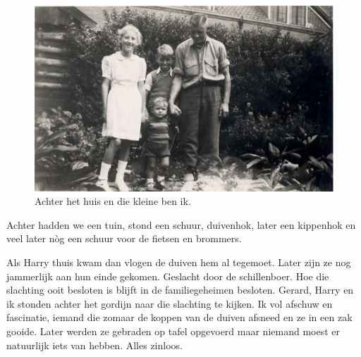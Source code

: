 \documentclass[12pt,twoside, openright]{memoir}
\begin{document}
\begin{figure}
\centering
\includegraphics[width=\textwidth]{img/34Rosmstraat2}
\caption*{\footnotesize Achter het huis en die kleine ben ik.}
\end{figure}

Achter hadden we een tuin, stond een schuur, duivenhok, later een kippenhok en veel later nòg een schuur voor de fietsen en brommers. 

Als Harry thuis kwam dan vlogen de duiven hem al tegemoet. Later zijn ze nog jammerlijk aan hun einde gekomen. Geslacht door de schillenboer. Hoe die slachting ooit besloten is blijft in de familiegeheimen besloten. Gerard, Harry en ik stonden achter het gordijn naar die slachting te kijken. Ik vol afschuw en fascinatie, iemand die zomaar de koppen van de duiven afsneed en ze in een zak gooide. Later werden ze gebraden op tafel opgevoerd maar niemand moest er natuurlijk iets van hebben. Alles zinloos.
\end{document}
